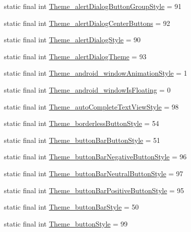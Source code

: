 \begin{DoxyCompactItemize}
\item 
static final int \hyperlink{classcheck_1_1test_1_1_r_1_1styleable_acba96b3fbc00ef03937429054fbe3036}{Theme\+\_\+alert\+Dialog\+Button\+Group\+Style} = 91
\item 
static final int \hyperlink{classcheck_1_1test_1_1_r_1_1styleable_a11c37dcf3c6bf471d394d417c9aaa633}{Theme\+\_\+alert\+Dialog\+Center\+Buttons} = 92
\item 
static final int \hyperlink{classcheck_1_1test_1_1_r_1_1styleable_ab1ac7d03d2b00801128e1263f5826e5c}{Theme\+\_\+alert\+Dialog\+Style} = 90
\item 
static final int \hyperlink{classcheck_1_1test_1_1_r_1_1styleable_ac9de00117911739b0431126a81b708d4}{Theme\+\_\+alert\+Dialog\+Theme} = 93
\item 
static final int \hyperlink{classcheck_1_1test_1_1_r_1_1styleable_af787bd8d14167f831eaf83cd8fc2098e}{Theme\+\_\+android\+\_\+window\+Animation\+Style} = 1
\item 
static final int \hyperlink{classcheck_1_1test_1_1_r_1_1styleable_a08050f289331059420ffd439bcbc10e8}{Theme\+\_\+android\+\_\+window\+Is\+Floating} = 0
\item 
static final int \hyperlink{classcheck_1_1test_1_1_r_1_1styleable_a2e1e6f06dba491f9e8aa0916badaeee8}{Theme\+\_\+auto\+Complete\+Text\+View\+Style} = 98
\item 
static final int \hyperlink{classcheck_1_1test_1_1_r_1_1styleable_a12279ad7c3b04030bd65962776fcef88}{Theme\+\_\+borderless\+Button\+Style} = 54
\item 
static final int \hyperlink{classcheck_1_1test_1_1_r_1_1styleable_afeba9266742fb85f098bb860e221c453}{Theme\+\_\+button\+Bar\+Button\+Style} = 51
\item 
static final int \hyperlink{classcheck_1_1test_1_1_r_1_1styleable_aaf6d54b7d21dd82c42f35041e1ce1c92}{Theme\+\_\+button\+Bar\+Negative\+Button\+Style} = 96
\item 
static final int \hyperlink{classcheck_1_1test_1_1_r_1_1styleable_a18a041fde9f2407a8e18b1c7a357e426}{Theme\+\_\+button\+Bar\+Neutral\+Button\+Style} = 97
\item 
static final int \hyperlink{classcheck_1_1test_1_1_r_1_1styleable_ac2ac7678c2fe6e4ec90fbff60457ded3}{Theme\+\_\+button\+Bar\+Positive\+Button\+Style} = 95
\item 
static final int \hyperlink{classcheck_1_1test_1_1_r_1_1styleable_aef00ad24e719805177672c1be58ab494}{Theme\+\_\+button\+Bar\+Style} = 50
\item 
static final int \hyperlink{classcheck_1_1test_1_1_r_1_1styleable_af32f3514cf5d1f07163a1a7b6adf5022}{Theme\+\_\+button\+Style} = 99

\end{DoxyCompactItemize}

